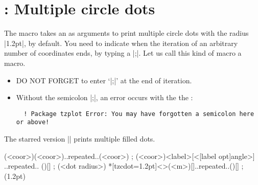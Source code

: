 \begin{tzcode}{.3}
\end{tzcode}

\begin{tzcode}{.3}
\end{tzcode}


\section{\protect\cmd{\tzcdots(*)}: Multiple circle dots}
\label{s:tzcdots}

The macro \icmd{\tzcdots} takes an  as arguments to print multiple circle dots with the radius |1.2pt|, by default.
You need to indicate when the iteration of an arbitrary number of coordinates ends, by typing a  |;|.
Let us call this kind of macro a  macro.

\remark
\begin{itemize}
\item DO NOT FORGET to enter `|;|' at the end of iteration.
\item Without the semicolon |;|, an error occurs with the the :
  \begin{verbatim}
  ! Package tzplot Error: You may have forgotten a semicolon here or above!
  \end{verbatim}
\end{itemize}


The starred version |\tzcdots*| prints multiple filled dots.

\begin{tzdef}
\tzcdots*(<coor>)(<coor>)..repeated..(<coor>) ;
 (<coor>){<label>}[<[label opt]angle>]
                            ..repeated.. (){}[] ; (<dot radius>)
 *[tzcdot=1.2pt]<>(<m>){}[]..repeated..(){}[] ; (1.2pt)
\end{tzdef}

